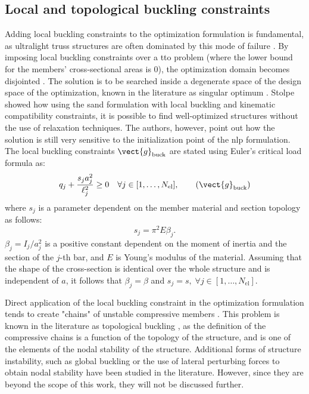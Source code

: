 \subsection{Local and topological buckling constraints}
Adding local buckling constraints to the optimization formulation is fundamental, as ultralight truss structures are often dominated by this mode of failure . By imposing local buckling constraints over a \gls{tto} problem (where the lower bound for the members' cross-sectional areas is 0), the optimization domain becomes disjointed . The solution is to be searched inside a degenerate space of the design space of the optimization, known in the literature as singular optimum . Stolpe  showed how using the \gls{sand} formulation with local buckling and kinematic compatibility constraints, it is possible to find well-optimized structures without the use of relaxation techniques. The authors, however, point out how the solution is still very sensitive to the initialization point of the \gls{nlp} formulation. The local buckling constraints $\vect{g}_{\text{buck}}$ are stated using Euler's critical load formula as:
\begin{equation}
    q_j  + \frac{s_j a_j^2}{\ell_j^2} \geq 0 \quad \forall j \in [1,\ldots, N_{\text{el}}],
    \tag{$\vect{g}_{\text{buck}}$}
    \label{eq:04_buck}
\end{equation}
where $s_j$ is a parameter dependent on the member material and section topology as follows:
\begin{equation}
    s_j=\pi^2 E \beta_j.
    \label{eq:04_s}
\end{equation}
$\beta_j=I_j/a^2_j$ is a positive constant dependent on the moment of inertia and the section of the $j$-th bar, and $E$ is Young's modulus of the material. Assuming that the shape of the cross-section is identical over the whole structure and is independent of $a$, it follows that  $\beta_j = \beta$ and $s_j = s, \; \forall j \in [1,\ldots, N_{\text{el}}]$.

Direct application of the local buckling constraint  in the optimization formulation tends to create "chains" of unstable compressive members . This problem is known in the literature as topological buckling , as the definition of the compressive chains is a function of the topology of the structure, and is one of the elements of the nodal stability of the structure. Additional forms of structure instability, such as global buckling  or the use of lateral perturbing forces to obtain nodal stability  have been studied in the literature. However, since they are beyond the scope of this work, they will not be discussed further.

